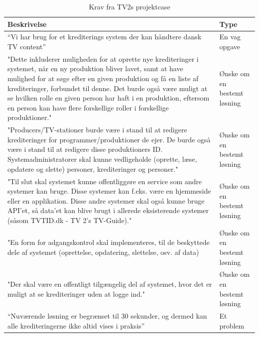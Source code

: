\begin{table}[ht]
    \begin{tabularx}{\textwidth}{|p{10cm}|X|}
        \hline
        \textbf{Beskrivelse} & \textbf{Type} \\
        \hline
        “Vi har brug for  et krediterings system der kan  håndtere  dansk TV content” 
        & En vag opgave \\
        
        \hline
        "Dette inkluderer muligheden for at oprette nye krediteringer i systemet, når en ny produktion bliver lavet, samt at have mulighed for at søge efter en given produktion og få en liste af krediteringer, forbundet til denne. Det burde også være muligt at se hvilken rolle en given person har haft i en produktion, eftersom en person kan have flere forskellige roller i forskellige produktioner."
        & Ønske om en bestemt løsning \\
        
        \hline 
        "Producers/TV-stationer burde være i stand til at redigere krediteringer for programmer/produktioner de ejer. De burde også være i stand til at redigere disse produktioners ID. Systemadministratorer skal kunne vedligeholde (oprette, læse, opdatere og slette) personer, krediteringer og personer."
        & Ønske om en bestemt løsning \\
        
        \hline
        "Til slut skal systemet kunne offentliggøre en service som andre systemer kan bruge. Disse systemer kan f.eks. være en hjemmeside eller en applikation. Disse andre systemer skal også kunne bruge API'et, så data'et kan blive brugt i allerede eksisterende systemer (såsom TVTID.dk - TV 2's TV-Guide)."
        & Ønske om en bestemt løsning \\
        
        \hline
        "En form for adgangskontrol skal implementeres, til de beskyttede dele af systemet (oprettelse, opdatering, slettelse, osv. af data)
        & Ønske om en bestemt løsning \\
        
        \hline
        "Der skal være en offentligt tilgængelig del af systemet, hvor det er muligt at se krediteringer uden at logge ind."
        & Ønske om en bestemt løsning \\
        
        \hline
        “Nuværende løsning er begrænset til 30 sekunder, og dermed kan alle krediteringerne ikke altid vises i praksis” 
        & Et problem \\
        \hline
    \end{tabularx}    
    \caption{Krav fra TV2s projektcase}
    \label{table:kravFraCase}
\end{table}

